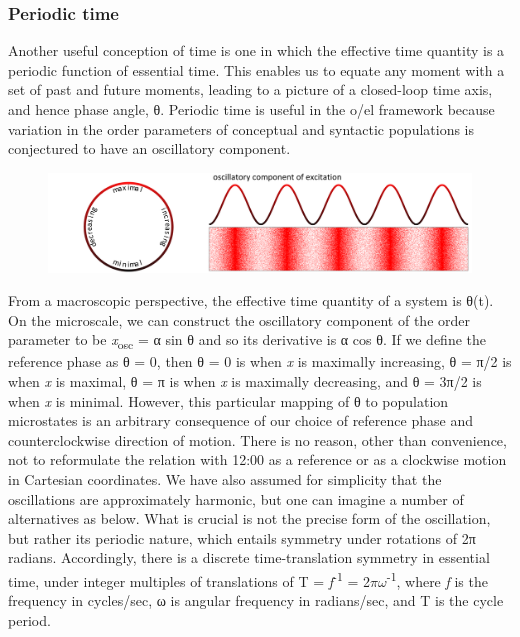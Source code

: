 \subsubsection{Periodic time}

Another useful conception of time is one in which the effective time quantity is a periodic function of  essential time. This enables us to equate any moment with a set of past and future moments, leading to a picture of a closed-loop time axis, and hence phase angle, θ. Periodic time is useful in the o/el framework because variation in the order parameters of conceptual and syntactic populations is conjectured to have an oscillatory component.

  
\begin{figure}
\includegraphics[width=\textwidth]{figures/Tilsen-img46.png}
\caption{\missingcaption}
\label{fig:}
\end{figure}
 

  From a macroscopic perspective, the effective time quantity of a system is θ(t). On the microscale, we can construct the oscillatory component of the order parameter to be \textit{x}\textsubscript{osc} = α sin θ and so its derivative is α cos θ. If we define the reference phase as θ = 0, then θ = 0 is when \textit{x} is maximally increasing, θ = π/2 is when \textit{x} is maximal, θ = π is when \textit{x} is maximally decreasing, and θ = 3π/2 is when \textit{x} is minimal. However, this particular mapping of θ to population microstates is an arbitrary consequence of our choice of reference phase and counterclockwise direction of motion. There is no reason, other than convenience, not to reformulate the relation with 12:00 as a reference or as a clockwise motion in Cartesian coordinates. We have also assumed for simplicity that the oscillations are approximately harmonic, but one can imagine a number of alternatives as below. What is crucial is not the precise form of the oscillation, but rather its periodic nature, which entails symmetry under rotations of 2π radians. Accordingly, there is a discrete time-translation symmetry in essential time, under integer multiples of translations of T = \textit{f}\textsuperscript{{}-1} = 2$\pi \omega $\textsuperscript{{}-1}, where \textit{f} is the frequency in cycles/sec, ω is angular frequency in radians/sec, and T is the cycle period.

